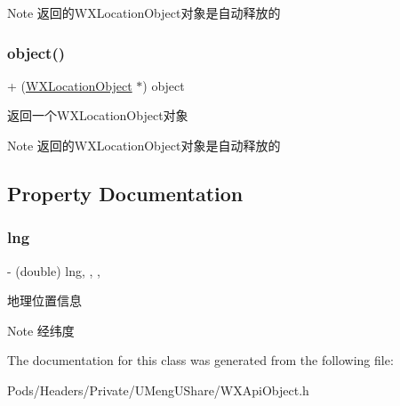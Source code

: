 \begin{DoxyNote}{Note}
返回的\+W\+X\+Location\+Object对象是自动释放的 
\end{DoxyNote}
\mbox{\label{interface_w_x_location_object_ad42a7781455ce3515267360bc029e384}} 
\subsubsection{\texorpdfstring{object()}{object()}\hspace{0.1cm}{\footnotesize\ttfamily [3/3]}}
{\footnotesize\ttfamily + (\mbox{\hyperlink{interface_w_x_location_object}{W\+X\+Location\+Object}} $\ast$) object \begin{DoxyParamCaption}{ }\end{DoxyParamCaption}}



返回一个\+W\+X\+Location\+Object对象 

\begin{DoxyNote}{Note}
返回的\+W\+X\+Location\+Object对象是自动释放的 
\end{DoxyNote}


\subsection{Property Documentation}
\mbox{\label{interface_w_x_location_object_a84ed947c84f559812941536a126e02f7}} 
\subsubsection{\texorpdfstring{lng}{lng}}
{\footnotesize\ttfamily -\/ (double) lng\hspace{0.3cm}{\ttfamily [read]}, {\ttfamily [write]}, {\ttfamily [nonatomic]}, {\ttfamily [assign]}}

地理位置信息 \begin{DoxyNote}{Note}
经纬度 
\end{DoxyNote}


The documentation for this class was generated from the following file\+:\begin{DoxyCompactItemize}
\item 
Pods/\+Headers/\+Private/\+U\+Meng\+U\+Share/W\+X\+Api\+Object.\+h\end{DoxyCompactItemize}
